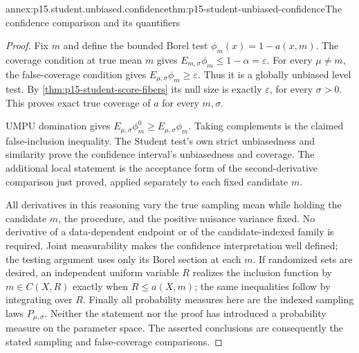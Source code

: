 \begin{annexitem}{annex:p15.student.unbiased.confidence}{thm:p15-student-unbiased-confidence}{The confidence comparison and its quantifiers}
\begin{proof}
Fix \(m\) and define the bounded Borel test
\(\phi_m(x)=1-a(x,m)\). The coverage condition
at true mean \(m\) gives
\(E_{m,\sigma}\phi_m\leq1-\alpha=\varepsilon\).
For every \(\mu\ne m\), the false-coverage
condition gives \(E_{\mu,\sigma}\phi_m\geq\varepsilon\).
Thus it is a globally unbiased level test.
By \cref{thm:p15-student-score-fibers} its
null size is exactly \(\varepsilon\), for
every \(\sigma>0\). This proves exact true
coverage of \(a\) for every \(m,\sigma\).

UMPU domination gives
\(E_{\mu,\sigma}\phi_m^0\geq E_{\mu,\sigma}\phi_m\).
Taking complements is the claimed
false-inclusion inequality. The Student test's
own strict unbiasedness and similarity prove
the confidence interval's unbiasedness and
coverage. The additional local statement is
the acceptance form of the second-derivative
comparison just proved, applied separately
to each fixed candidate \(m\).

All derivatives in this reasoning vary the
true sampling mean while holding the
candidate \(m\), the procedure, and the
positive nuisance variance fixed.
No derivative of a data-dependent endpoint
or of the candidate-indexed family is required.
Joint measurability makes the confidence
interpretation well defined; the testing
argument uses only its Borel section at
each \(m\). If randomized sets are desired,
an independent uniform variable \(R\) realizes
the inclusion function by
\(m\in C(X,R)\) exactly when \(R\leq a(X,m)\);
the same inequalities follow by integrating
over \(R\).
Finally all probability measures here are
the indexed sampling laws \(P_{\mu,\sigma}\).
Neither the statement nor the proof has
introduced a probability measure on the
parameter space. The asserted conclusions
are consequently the stated sampling and
false-coverage comparisons.
\end{proof}
\end{annexitem}

